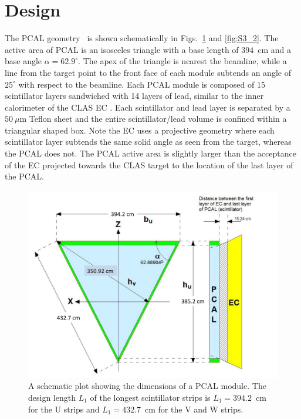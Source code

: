 \section{Design} \label{Design}

The PCAL geometry~\cite{2015002} is shown schematically in Figs.~\ref{fig:S3_1} and \ref{fig:S3_2}. The
active area of PCAL is an isosceles triangle with a base length of $394$~cm and a base angle $\alpha=62.9^\circ$.
The apex of the triangle is nearest the beamline, while a line from the target point to the front face of each
module subtends an angle of $25^\circ$ with respect to the beamline. Each PCAL module is composed of 15
scintillator layers sandwiched with 14 layers of lead, similar to the inner calorimeter of the CLAS EC
\cite{clas6nim}. Each scintillator and lead layer is separated by a $50~\mu$m Teflon sheet and the entire
scintillator/lead volume is confined within a triangular shaped box. Note the EC uses a projective geometry
where each scintillator layer subtends the same solid angle as seen from the target, whereas the PCAL does
not. The PCAL active area is slightly larger than the acceptance of the EC projected towards the CLAS target
to the location of the last layer of the PCAL. 

\begin{figure}[h]
\centering
\includegraphics[width=1.0\columnwidth,keepaspectratio]{img/S3_1.pdf}
\caption[Schematic plot of PCAL]{A schematic plot showing the dimensions of a PCAL module. The design length
  $L_1$ of the longest scintillator strips is $L_1=394.2$~cm for the U strips and $L_1=432.7$~cm for the V
  and W strips. }
\label{fig:S3_1}
\end{figure}

